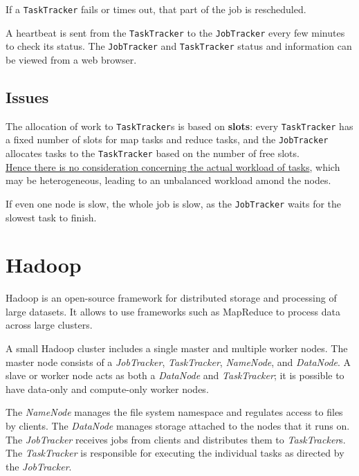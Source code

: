 If a \texttt{TaskTracker} fails or times out, that part of the job is rescheduled.

A heartbeat is sent from the \texttt{TaskTracker} to the \texttt{JobTracker} every few minutes to check its status. The
\texttt{JobTracker} and \texttt{TaskTracker} status and information can be viewed from a web browser.

\subsection{Issues}
The allocation of work to \texttt{TaskTracker}s is based on \textbf{slots}:
every \texttt{TaskTracker} has a fixed number of slots for map tasks and reduce tasks, and the \texttt{JobTracker} allocates tasks to the \texttt{TaskTracker} based on the number of free slots.\\
\ul{Hence there is no consideration concerning the actual workload of tasks}, which may be heterogeneous, leading to an unbalanced workload amond the nodes.

If even one node is slow, the whole job is slow, as the \texttt{JobTracker} waits for the slowest task to finish.

\section{Hadoop}
Hadoop is an open-source framework for distributed storage and processing of large datasets. It allows to use frameworks such as MapReduce to process data across large clusters.

A small Hadoop cluster includes a single master and
multiple worker nodes.
The master node consists of a \textit{JobTracker}, \textit{TaskTracker},
\textit{NameNode}, and \textit{DataNode}.
A slave or worker node acts as both a \textit{DataNode} and
\textit{TaskTracker}; it is possible to have data-only and compute-only worker nodes.

The \textit{NameNode} manages the file system namespace and regulates access to files by clients. The \textit{DataNode} manages storage attached to the nodes that it runs on.\\
The \textit{JobTracker} receives jobs from clients and distributes them to \textit{TaskTracker}s. The \textit{TaskTracker} is responsible for executing the individual tasks as directed by the \textit{JobTracker}.


